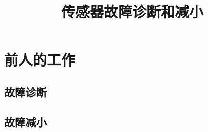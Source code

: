 \documentclass{amsart}
\title{传感器故障诊断和减小}
\author{}
\date{}
\begin{document}
\section{前人的工作}

\subsection{故障诊断}

\subsection{故障减小}
\end{document}
